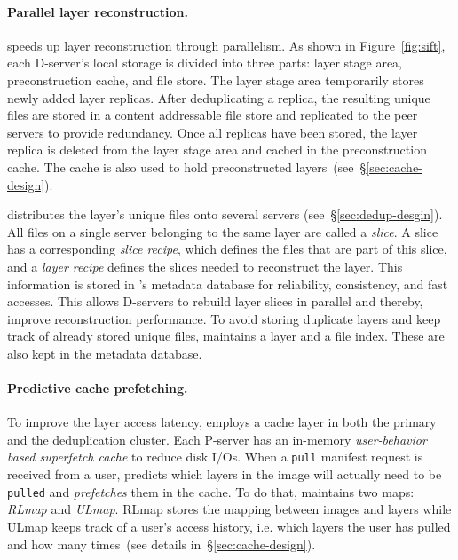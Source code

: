 \paragraph{Parallel layer reconstruction.}
%
\sysname speeds up layer reconstruction through parallelism.
%
As shown in Figure~\ref{fig:sift}, each D-server's local storage is divided
into three parts: layer stage area, preconstruction cache, and file store.
%
The layer stage area temporarily stores newly added layer replicas.
%
After deduplicating a replica, the resulting unique files are stored in a
content addressable file store and replicated to the peer servers to provide
redundancy. Once all replicas have been stored, the layer replica is deleted
from the layer stage area and cached in the preconstruction cache.
%
The cache is also used to hold preconstructed
layers~(see~\S\ref{sec:cache-design}).

\sysname distributes the layer's unique files onto several servers
(see~\S\ref{sec:dedup-desgin}).
%
All files on a single server belonging to the same layer are called a
\emph{slice}.
%
A slice has a corresponding \emph{slice recipe}, which defines the files that
are part of this slice, and a \emph{layer recipe} defines the slices needed to
reconstruct the layer.
%
This information is stored in \sysname{}'s metadata database for reliability,
consistency, and fast accesses. 
%
This allows D-servers to rebuild layer slices in parallel and thereby, improve
reconstruction performance.
%
To avoid storing duplicate layers and keep track of already stored unique
files, \sysname maintains a layer and a file index. These are also kept in the
metadata database.




\paragraph{Predictive cache prefetching.}
%
To improve the layer access latency, \sysname employs a cache layer in both the
primary and the deduplication cluster.
%
Each P-server has an in-memory \emph{user-behavior based superfetch cache} to
reduce disk I/Os.
%
When a \texttt{pull} manifest request is received from a user, \sysname
predicts which layers in the image will actually need to be \texttt{pulled} and
\emph{prefetches} them in the cache.
%
To do that, \sysname maintains two maps: \emph{RLmap} and \emph{ULmap}.
%
RLmap stores the mapping between images and layers while ULmap keeps track of a
user's access history, i.e. which layers the user has pulled and how many
times~(see details in~\S\ref{sec:cache-design}).

